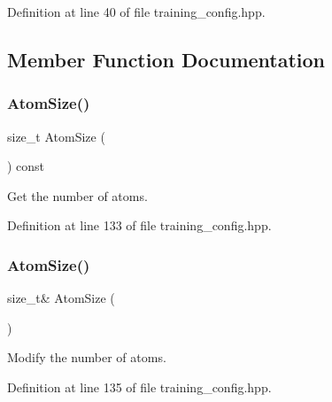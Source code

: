 Definition at line 40 of file training\+\_\+config.\+hpp.



\subsection{Member Function Documentation}
\mbox{\label{classmlpack_1_1rl_1_1TrainingConfig_ad7df1d452c9f3c80149f18537f1736d4}} 
\subsubsection{Atom\+Size()\hspace{0.1cm}{\footnotesize\ttfamily [1/2]}}
{\footnotesize\ttfamily size\+\_\+t Atom\+Size (\begin{DoxyParamCaption}{ }\end{DoxyParamCaption}) const\hspace{0.3cm}{\ttfamily [inline]}}



Get the number of atoms. 



Definition at line 133 of file training\+\_\+config.\+hpp.

\mbox{\label{classmlpack_1_1rl_1_1TrainingConfig_a30f42fc518e2d5826247f7eab599ad5e}} 
\subsubsection{Atom\+Size()\hspace{0.1cm}{\footnotesize\ttfamily [2/2]}}
{\footnotesize\ttfamily size\+\_\+t\& Atom\+Size (\begin{DoxyParamCaption}{ }\end{DoxyParamCaption})\hspace{0.3cm}{\ttfamily [inline]}}



Modify the number of atoms. 



Definition at line 135 of file training\+\_\+config.\+hpp.

\mbox{\label{classmlpack_1_1rl_1_1TrainingConfig_aa6ad347e43fbd017a857577c98b2c60a}} 
